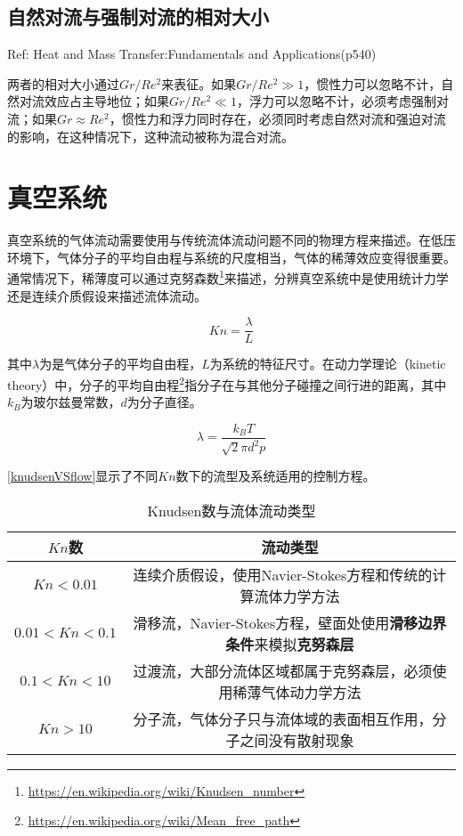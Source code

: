 \subsection{自然对流与强制对流的相对大小}

Ref: Heat and Mass Transfer:Fundamentals and Applications(p540)

两者的相对大小通过$ Gr/Re^2 $来表征。如果$ Gr/Re^2 \gg 1 $，惯性力可以忽略不计，自然对流效应占主导地位；如果$ Gr/Re^2 \ll 1 $，浮力可以忽略不计，必须考虑强制对流；如果$ Gr\approx Re^2 $，惯性力和浮力同时存在，必须同时考虑自然对流和强迫对流的影响，在这种情况下，这种流动被称为混合对流。

\section{真空系统}
真空系统的气体流动需要使用与传统流体流动问题不同的物理方程来描述。在低压环境下，气体分子的平均自由程与系统的尺度相当，气体的稀薄效应变得很重要。通常情况下，稀薄度可以通过克努森数\footnote{\url{https://en.wikipedia.org/wiki/Knudsen_number}}来描述，分辨真空系统中是使用统计力学还是连续介质假设来描述流体流动。

\begin{equation}\label{Knudsen}
Kn = \frac{\lambda}{L}
\end{equation}

其中$ \lambda $为是气体分子的平均自由程，$ L $为系统的特征尺寸。在动力学理论（kinetic theory）中，分子的平均自由程\footnote{\url{https://en.wikipedia.org/wiki/Mean_free_path}}指分子在与其他分子碰撞之间行进的距离，其中$ k_B $为玻尔兹曼常数，$ d $为分子直径。

\begin{equation}
\lambda = \frac{k_B T}{\sqrt{2}\pi d^2 p}
\end{equation}

\autoref{knudsenVSflow}显示了不同$ Kn $数下的流型及系统适用的控制方程。

\begin{table}[h]
    \centering
    \caption{Knudsen数与流体流动类型}
    \label{knudsenVSflow}
    \begin{tabular}{cc}
        \toprule
        $ Kn $数 & 流动类型 \\
        \midrule
        $ Kn<0.01 $ & 连续介质假设，使用Navier-Stokes方程和传统的计算流体力学方法 \\
        $ 0.01<Kn<0.1 $ & 滑移流，Navier-Stokes方程，壁面处使用\textbf{滑移边界条件}来模拟\textbf{克努森层} \\
        $ 0.1<Kn<10 $ & 过渡流，大部分流体区域都属于克努森层，必须使用稀薄气体动力学方法 \\
        $ Kn>10 $ & 分子流，气体分子只与流体域的表面相互作用，分子之间没有散射现象 \\
        \bottomrule
    \end{tabular}
\end{table}


